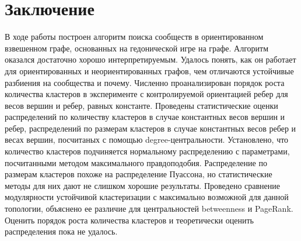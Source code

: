 \chapter{Заключение}

В ходе работы построен алгоритм поиска сообществ в ориентированном взвешенном графе, основанных на гедонической игре на графе. Алгоритм оказался достаточно хорошо интерпретируемым. Удалось понять, как он работает для ориентированных и неориентированных графов, чем отличаются устойчивые разбиения на сообщества и почему. Численно проанализирован порядок роста количества кластеров в эксперименте с контролируемой ориентацией ребер для весов вершин и ребер, равных константе. Проведены статистические оценки распределений по количеству кластеров в случае константных весов вершин и ребер, распределений по размерам кластеров в случае константных весов ребер и весах вершин, посчитаных с помощью degree-центральности. Установлено, что количество кластеров подчиняется нормальному распределению с параметрами, посчитанными методом максимального правдоподобия. Распределение по размерам кластеров похоже на распределение Пуассона, но статистические методы для них дают не слишком хорошие результаты. Проведено сравнение модулярности устойчивой кластеризации с максимально возможной для данной топологии, объяснено ее различие для центральностей betweenness и PageRank. Оценить порядок роста количества кластеров и теоретически оценить распределения пока не удалось. 